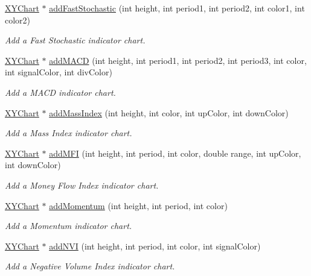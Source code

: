\begin{DoxyCompactItemize}
\hyperlink{class_x_y_chart}{X\+Y\+Chart} $\ast$ \hyperlink{class_finance_chart_aaf35dc123849c0ad4a959f2e1667360c}{add\+Fast\+Stochastic} (int height, int period1, int period2, int color1, int color2)
\begin{DoxyCompactList}\small\item\em Add a Fast Stochastic indicator chart. \end{DoxyCompactList}\item 
\hyperlink{class_x_y_chart}{X\+Y\+Chart} $\ast$ \hyperlink{class_finance_chart_a3f46f24c67ed7a2c4a5ffa77fbe7ba73}{add\+M\+A\+CD} (int height, int period1, int period2, int period3, int color, int signal\+Color, int div\+Color)
\begin{DoxyCompactList}\small\item\em Add a M\+A\+CD indicator chart. \end{DoxyCompactList}\item 
\hyperlink{class_x_y_chart}{X\+Y\+Chart} $\ast$ \hyperlink{class_finance_chart_a452f5d65f747033467a62eb280babfdc}{add\+Mass\+Index} (int height, int color, int up\+Color, int down\+Color)
\begin{DoxyCompactList}\small\item\em Add a Mass Index indicator chart. \end{DoxyCompactList}\item 
\hyperlink{class_x_y_chart}{X\+Y\+Chart} $\ast$ \hyperlink{class_finance_chart_ab6f774100ffc593f93eed25c98facf6f}{add\+M\+FI} (int height, int period, int color, double range, int up\+Color, int down\+Color)
\begin{DoxyCompactList}\small\item\em Add a Money Flow Index indicator chart. \end{DoxyCompactList}\item 
\hyperlink{class_x_y_chart}{X\+Y\+Chart} $\ast$ \hyperlink{class_finance_chart_afbdc6d4410549928b041060bfb03b126}{add\+Momentum} (int height, int period, int color)
\begin{DoxyCompactList}\small\item\em Add a Momentum indicator chart. \end{DoxyCompactList}\item 
\hyperlink{class_x_y_chart}{X\+Y\+Chart} $\ast$ \hyperlink{class_finance_chart_a388881982244585b53d8a318ad4e6254}{add\+N\+VI} (int height, int period, int color, int signal\+Color)
\begin{DoxyCompactList}\small\item\em Add a Negative Volume Index indicator chart. \end{DoxyCompactList}\item 

\end{DoxyCompactItemize}
